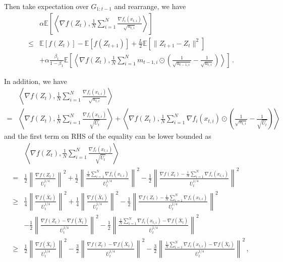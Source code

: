 \documentclass{article} %
\begin{document}
Then take expectation over $G_{1:t-1}$ and rearrange, we have 
\begin{align}\label{eq: exp_lip}
& \alpha  \mathbb E\left[\left \langle \nabla f( Z_{t}), \frac{1}{N} \sum_{i=1}^N \frac{\nabla f_i(x_{t,i})}{\sqrt{u_{t,i}}}  \right \rangle \right]\\
\leq & \mathbb E  [f( Z_{t})]  -  \mathbb E [f( Z_{t+1})] + \frac{L}{2} \mathbb E\left[\| Z_{t+1}-  Z_{t}\|^2 \right] \nonumber  \\
&+ \alpha \frac{\beta_1}{1-\beta_1}  \mathbb E \left [\left \langle \nabla f( Z_{t}) , \frac{1}{N} \sum_{i=1}^N m_{t-1	,i} \odot (\frac{1}{\sqrt{u_{t-1,i}}} - \frac{1}{\sqrt{u_{t,i}}}) \right \rangle \right] \, .
\end{align}

In addition, we have 
\begin{align}\label{eq: u_to_u_bar}
&\left \langle \nabla f( Z_{t}), \frac{1}{N} \sum_{i=1}^N \frac{\nabla f_i(x_{t,i})}{\sqrt{u_{t,i}}}  \right \rangle  \nonumber \\
= &  \left \langle \nabla f( Z_{t}), \frac{1}{N} \sum_{i=1}^N \frac{\nabla f_i( x_{t,i})}{\sqrt{\overline U_{t}}}  \right \rangle  +\left \langle \nabla f( Z_{t}), \frac{1}{N} \sum_{i=1}^N \nabla f_i( x_{t,i})\odot \left(\frac{1}{\sqrt{u_{t,i}}} - \frac{1}{\sqrt{\overline U_{t}}}  \right)  \right \rangle 
\end{align}
and the first term on RHS of the equality can be lower bounded as 
\begin{align} \label{eq: split_1}
&\left \langle \nabla f( Z_{t}), \frac{1}{N} \sum_{i=1}^N \frac{\nabla f_i( x_{t,i})}{\sqrt{\overline U_{t}}}  \right \rangle \nonumber \\
= &\frac{1}{2} \left\|\frac{\nabla f( Z_{t})}{\overline U_{t}^{1/4}}\right\|^2 + \frac{1}{2}\left\|  \frac{\frac{1}{N}\sum_{i=1}^N \nabla f_i( x_{t,i}) }{\overline U_{t}^{1/4}}  \right\|^2 - \frac{1}{2 }\left\| \frac{\nabla f( Z_{t}) -\frac{1}{N}\sum_{i=1}^N \nabla f_i( x_{t,i})}{\overline U_{t}^{1/4}} \right\|^2 \nonumber \\
\geq & \frac{1}{4} \left\|\frac{\nabla f( \overline X_{t})}{\overline U_{t}^{1/4}}\right\|^2 + \frac{1}{4}\left\|  \frac{ \nabla f( \overline X_{t})}{\overline U_{t}^{1/4}}  \right\|^2 - \frac{1}{2 }\left\| \frac{\nabla f( Z_{t}) -\frac{1}{N}\sum_{i=1}^N \nabla f_i( x_{t,i})}{\overline U_{t}^{1/4}} \right\|^2  \nonumber \\
&- \frac{1}{2} \left\|\frac{\nabla f( Z_{t}) -\nabla f( \overline X_{t})}{\overline U_{t}^{1/4}}\right\|^2 - \frac{1}{2} \left\|  \frac{ \frac{1}{N}\sum_{i=1}^N \nabla f_i( x_{t,i}) -  \nabla f( \overline X_{t})}{\overline U_{t}^{1/4}}  \right\|^2 \nonumber \\
\geq & \frac{1}{2} \left\|\frac{\nabla f( \overline X_{t})}{\overline U_{t}^{1/4}}\right\|^2   - \frac{3}{2} \left\|\frac{\nabla f( Z_{t}) -\nabla f( \overline X_{t})}{\overline U_{t}^{1/4}}\right\|^2 - \frac{3}{2} \left\|  \frac{ \frac{1}{N}\sum_{i=1}^N \nabla f_i( x_{t,i}) -  \nabla f( \overline X_{t})}{\overline U_{t}^{1/4}}  \right\|^2 \, ,
\end{align}
\end{document}
